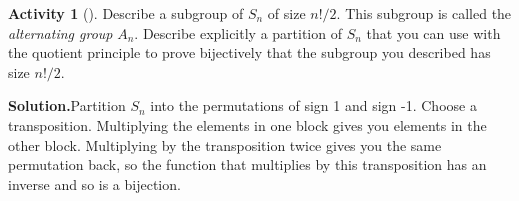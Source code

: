 \documentclass[10pt,]{book}
\theoremstyle{plain}
\theoremstyle{definition}
\newtheorem{activity}[project]{Activity}
\numberwithin{equation}{chapter}
\begin{document}
\begin{activity}[]\label{alternatinggroup}
Describe a subgroup of \(S_n\) of size \(n!/2\). This subgroup is called the \emph{alternating group} \(A_n\). Describe explicitly a partition of \(S_n\) that you can use with the quotient principle to prove bijectively that the subgroup you described has size \(n!/2\).%
\par\medskip\noindent%
\textbf{Solution.}\quad Partition \(S_n\) into the permutations of sign 1 and sign -1. Choose a transposition. Multiplying the elements in one block gives you elements in the other block. Multiplying by the transposition twice gives you the same permutation back, so the function that multiplies by this transposition has an inverse and so is a bijection.%
\end{activity}
\typeout{************************************************}
\typeout{************************************************}
\end{document}
